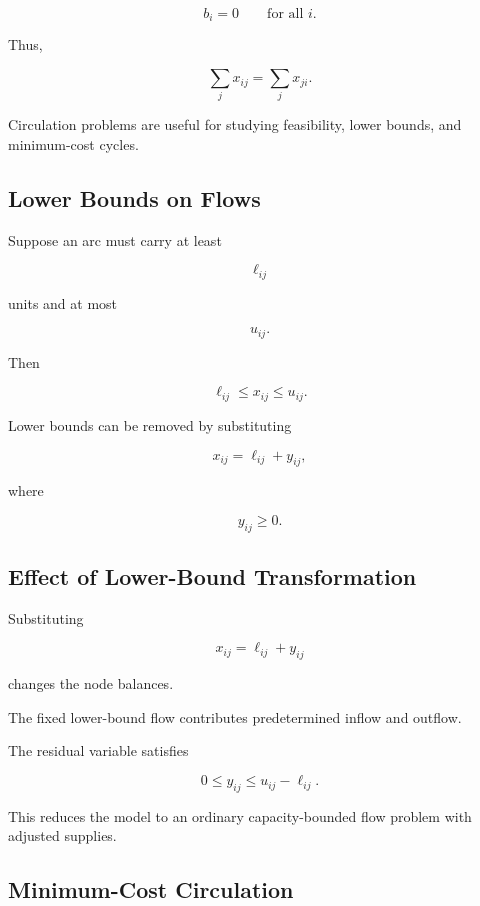 \[
\boxed{
b_i=0
\qquad
\text{for all }i.
}
\]

Thus,

\[
\boxed{
\sum_jx_{ij}
=
\sum_jx_{ji}.
}
\]

Circulation problems are useful for studying feasibility, lower bounds,
and minimum-cost cycles.

\subsection{Lower Bounds on Flows}
\label{subsec:flow-lower-bounds}

Suppose an arc must carry at least

\[
\ell_{ij}
\]

units and at most

\[
u_{ij}.
\]

Then

\[
\boxed{
\ell_{ij}
\leq
x_{ij}
\leq
u_{ij}.
}
\]

Lower bounds can be removed by substituting

\[
\boxed{
x_{ij}
=
\ell_{ij}
+
y_{ij},
}
\]

where

\[
y_{ij}\geq0.
\]

\subsection{Effect of Lower-Bound Transformation}
\label{subsec:lower-bound-transformation}

Substituting

\[
x_{ij}=\ell_{ij}+y_{ij}
\]

changes the node balances.

The fixed lower-bound flow contributes predetermined inflow and outflow.

The residual variable satisfies

\[
\boxed{
0\leq y_{ij}\leq u_{ij}-\ell_{ij}.
}
\]

This reduces the model to an ordinary capacity-bounded flow problem with
adjusted supplies.

\subsection{Minimum-Cost Circulation}
\label{subsec:minimum-cost-circulation}

